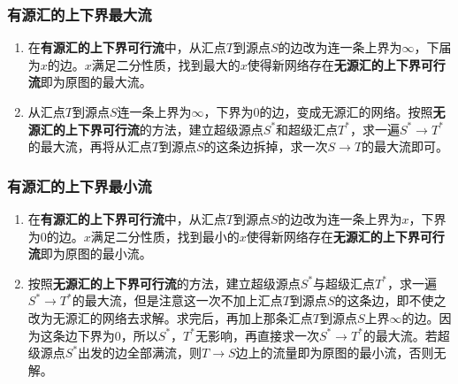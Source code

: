 \documentclass[landscape, oneside, a4paper, cs4size]{book}
\begin{document}
\begin{multicols}{2}
\begin{spacing}{0.72}
\begin{spacing}{0.50}
\begin{spacing}{0.5}
			\subsubsection*{有源汇的上下界最大流}
			\begin{enumerate}
				\item 在\textbf{有源汇的上下界可行流}中，从汇点$T$到源点$S$的边改为连一条上界为$\infty$，下届为$x$的边。$x$满足二分性质，找到最大的$x$使得新网络存在\textbf{无源汇的上下界可行流}即为原图的最大流。
				\item 从汇点$T$到源点$S$连一条上界为$\infty$，下界为$0$的边，变成无源汇的网络。按照\textbf{无源汇的上下界可行流}的方法，建立超级源点$S^*$和超级汇点$T^*$，求一遍$S^* \rightarrow T^*$的最大流，再将从汇点$T$到源点$S$的这条边拆掉，求一次$S \rightarrow T$的最大流即可。
			\end{enumerate}
			\subsubsection*{有源汇的上下界最小流}
			\begin{enumerate}
				\item 在\textbf{有源汇的上下界可行流}中，从汇点$T$到源点$S$的边改为连一条上界为$x$，下界为$0$的边。$x$满足二分性质，找到最小的$x$使得新网络存在\textbf{无源汇的上下界可行流}即为原图的最小流。
				\item 按照\textbf{无源汇的上下界可行流}的方法，建立超级源点$S^*$与超级汇点$T^*$，求一遍$S^* \rightarrow T^*$的最大流，但是注意这一次不加上汇点$T$到源点$S$的这条边，即不使之改为无源汇的网络去求解。求完后，再加上那条汇点$T$到源点$S$上界$\infty$的边。因为这条边下界为$0$，所以$S^*$，$T^*$无影响，再直接求一次$S^* \rightarrow T^*$的最大流。若超级源点$S^*$出发的边全部满流，则$T \rightarrow S$边上的流量即为原图的最小流，否则无解。
			\end{enumerate}

\end{spacing}
\end{spacing}
\end{spacing}
\end{multicols}
\end{document}
